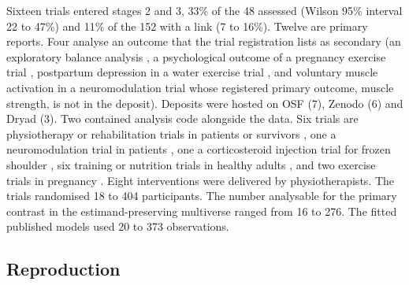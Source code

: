 Sixteen trials entered stages 2 and 3, 33\% of the 48 assessed (Wilson 95\% interval 22 to 47\%) and 11\% of the 152 with a link (7 to 16\%). Twelve are primary reports. Four analyse an outcome that the trial registration lists as secondary (an exploratory balance analysis \cite{Suarez_2026}, a psychological outcome of a pregnancy exercise trial \cite{Garnaes_2019}, postpartum depression in a water exercise trial \cite{Navas_2021}, and voluntary muscle activation in a neuromodulation trial \cite{Esfahani_2026} whose registered primary outcome, muscle strength, is not in the deposit). Deposits were hosted on OSF (7), Zenodo (6) and Dryad (3). Two contained analysis code alongside the data. Six trials are physiotherapy or rehabilitation trials in patients or survivors \cite{Kiouloukiotis_2026,Lytras_2026,Li_2022,Rashad_2026,Santiago_2024,Darlow_2019}, one a neuromodulation trial in patients \cite{Esfahani_2026}, one a corticosteroid injection trial for frozen shoulder \cite{Sharma_2016}, six training or nutrition trials in healthy adults \cite{Suarez_2026,Hobein_2026,Escalante_2016,Coleman_2024,Yu_2025,Desai_2025}, and two exercise trials in pregnancy \cite{Garnaes_2019,Navas_2021}. Eight interventions were delivered by physiotherapists. The trials randomised 18 to 404 participants. The number analysable for the primary contrast in the estimand-preserving multiverse ranged from 16 to 276. The fitted published models used 20 to 373 observations.

\subsection{Reproduction}\label{reproduction}

